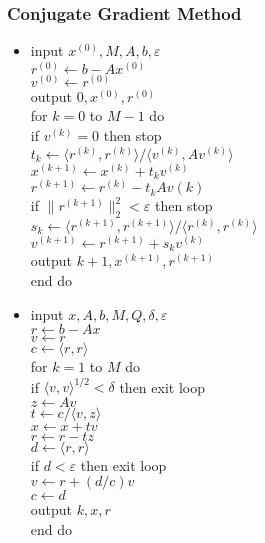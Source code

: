 \documentclass[notheorems,mathserif,table,compress]{beamer}  %
\begin{document}
%
\begin{frame}
\frametitle{Conjugate Gradient Method} 
\begin{itemize}
\item
input $x^{(0)},M,A,b,\varepsilon$\\
$r^{(0)}\leftarrow b-Ax^{(0)}$\\
$v^{(0)}\leftarrow r^{(0)}$\\
output $0,x^{(0)},r^{(0)}$\\
for $k=0$ to $M-1$ do\\
\qquad if $v^{(k)}=0$ then stop\\
\qquad $t_k\leftarrow \langle r^{(k)},r^{(k)}\rangle/\langle v^{(k)},Av^{(k)}\rangle$\\
\qquad $x^{(k+1)}\leftarrow x^{(k)}+t_kv^{(k)}$\\
\qquad $r^{(k+1)}\leftarrow r^{(k)}-t_kAv{(k)}$\\
\qquad if $\parallel r^{(k+1)}\parallel_2^2<\varepsilon$ then stop\\
\qquad $s_k\leftarrow \langle r^{(k+1)},r^{(k+1)}\rangle/\langle r^{(k)},r^{(k)}\rangle$\\
\qquad $v^{(k+1)}\leftarrow r^{(k+1)}+s_kv^{(k)}$\\
\qquad output $k+1,x^{(k+1)},r^{(k+1)}$\\
end do
\end{itemize}
\end{frame}

%
\begin{frame}
\begin{itemize}
\item 
input $x,A,b,M,Q,\delta,\varepsilon$\\
$r\leftarrow b-Ax$\\
$v\leftarrow r$\\
$c\leftarrow \langle r,r\rangle$\\
for $k=1$ to $M$ do\\
\qquad if $\langle v,v\rangle^{1/2}<\delta$ then exit loop\\
\qquad$z\leftarrow Av$\\
\qquad$t\leftarrow c/\langle v,z\rangle$\\
\qquad$x\leftarrow x+tv$\\
\qquad$r\leftarrow r-tz$\\
\qquad$d\leftarrow \langle r,r\rangle$\\
\qquad if $d<\varepsilon$ then exit loop\\
\qquad$v\leftarrow r+(d/c)v$\\
\qquad$c\leftarrow d$\\
\qquad output $k,x,r$\\
end do
\end{itemize}
\end{frame}
\end{document}
